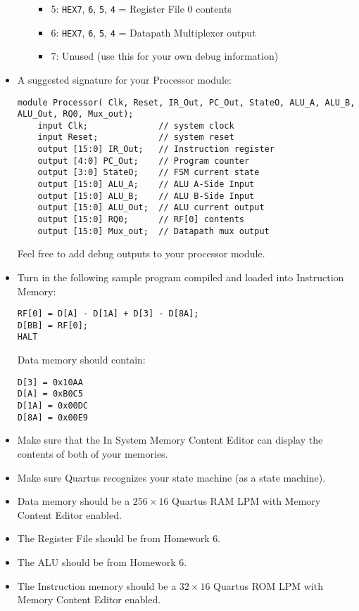 \begin{itemize}
\begin{itemize}
\begin{itemize}
            \item 5: \verb|HEX7|, \verb|6|, \verb|5|, \verb|4| = Register File 0 contents
            \item 6: \verb|HEX7|, \verb|6|, \verb|5|, \verb|4| = Datapath Multiplexer output
            \item 7: Unused (use this for your own debug information)
        \end{itemize}
    \end{itemize}
    \item A suggested signature for your Processor module:
    \begin{lstlisting}
module Processor( Clk, Reset, IR_Out, PC_Out, StateO, ALU_A, ALU_B, ALU_Out, RQ0, Mux_out);
    input Clk;              // system clock
    input Reset;            // system reset
    output [15:0] IR_Out;   // Instruction register
    output [4:0] PC_Out;    // Program counter
    output [3:0] StateO;    // FSM current state
    output [15:0] ALU_A;    // ALU A-Side Input
    output [15:0] ALU_B;    // ALU B-Side Input
    output [15:0] ALU_Out;  // ALU current output
    output [15:0] RQ0;      // RF[0] contents
    output [15:0] Mux_out;  // Datapath mux output
    \end{lstlisting}
    Feel free to add debug outputs to your processor module.
    \item Turn in the following sample program compiled and loaded into Instruction Memory:
    \begin{lstlisting}[numbers=none]
RF[0] = D[A] - D[1A] + D[3] - D[8A];
D[BB] = RF[0];
HALT
    \end{lstlisting}
    Data memory should contain:
    \begin{lstlisting}[numbers=none]
D[3] = 0x10AA
D[A] = 0xB0C5
D[1A] = 0x00DC
D[8A] = 0x00E9
    \end{lstlisting}
    \item Make sure that the In System Memory Content Editor can display the contents of both of your memories.
    \item Make sure Quartus recognizes your state machine (as a state machine).
    \item Data memory should be a $256 \times 16$ Quartus RAM LPM with Memory Content Editor enabled.
    \item The Register File should be from Homework 6.
    \item The ALU should be from Homework 6.
    \item The Instruction memory should be a $32 \times  16$ Quartus ROM LPM with Memory Content Editor enabled.

\end{itemize}
